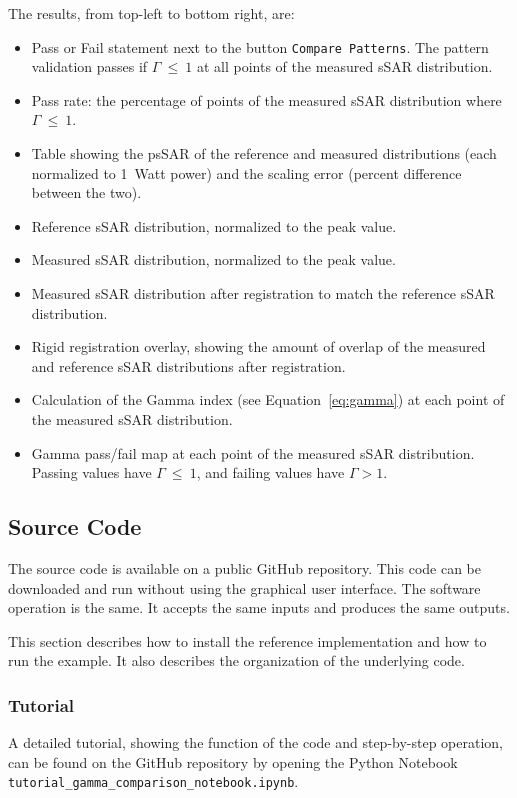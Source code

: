 \documentclass{./class/itisreport}
\begin{document}
The results, from top-left to bottom right, are:
\begin{itemize}
\item Pass or Fail statement next to the button \verb|Compare Patterns|. The pattern validation passes if $\Gamma~\leq~1$ at all points of the measured sSAR distribution.
\item Pass rate: the percentage of points of the measured sSAR distribution where  $\Gamma ~\leq~1$.
\item Table showing the psSAR of the reference and measured distributions (each normalized to 1~Watt power) and the scaling error (percent difference between the two).
\item Reference sSAR distribution, normalized to the peak value.
\item Measured sSAR distribution, normalized to the peak value.
\item Measured sSAR distribution after registration to match the reference sSAR distribution.
\item Rigid registration overlay, showing the amount of overlap of the measured and reference sSAR distributions after registration.
\item Calculation of the Gamma index (see Equation~\ref{eq:gamma}) at each point of the measured sSAR distribution.
\item Gamma pass/fail map at each point of the measured sSAR distribution. Passing values have $\Gamma~\leq~1$, and failing values have $\Gamma > 1$.
\end{itemize}


\FloatBarrier
\subsection{Source Code}

The source code is available on a public GitHub repository. This code can be downloaded and run without using the graphical user interface. The software operation is the same. It accepts the same inputs and produces the same outputs. 

This section describes how to install the reference implementation and how to run the example. It also describes the organization of the underlying code.

\subsubsection{Tutorial}

A detailed tutorial, showing the function of the code and step-by-step operation, can be found on the GitHub repository by opening the Python Notebook  \verb|tutorial_gamma_comparison_notebook.ipynb|.
\end{document}
